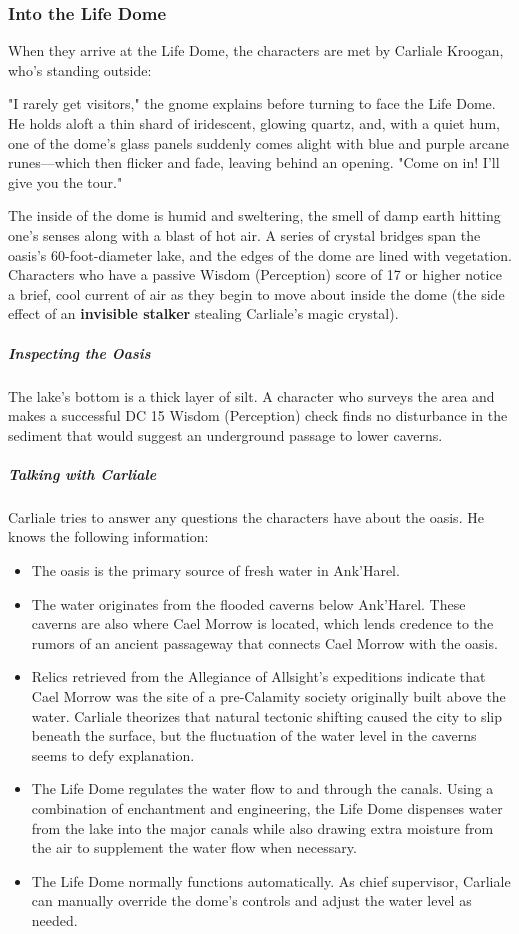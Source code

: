 \documentclass[10pt,a4paper,twoside,fancy,bg=print,twocolumn,openany,nodeprecatedcode]{dndbook}
\begin{document}
\subsubsection{Into the Life Dome}
When they arrive at the Life Dome, the characters are met by Carliale Kroogan, who's standing outside:

\begin{DndReadAloud}{}
"I rarely get visitors," the gnome explains before turning to face the Life Dome. He holds aloft a thin shard of iridescent, glowing quartz, and, with a quiet hum, one of the dome's glass panels suddenly comes alight with blue and purple arcane runes—which then flicker and fade, leaving behind an opening. "Come on in! I'll give you the tour."

\end{DndReadAloud}

The inside of the dome is humid and sweltering, the smell of damp earth hitting one's senses along with a blast of hot air. A series of crystal bridges span the oasis's 60-foot-diameter lake, and the edges of the dome are lined with vegetation. Characters who have a passive Wisdom (Perception) score of 17 or higher notice a brief, cool current of air as they begin to move about inside the dome (the side effect of an \textbf{invisible stalker} stealing Carliale's magic crystal).

\subparagraph{Inspecting the Oasis}
The lake's bottom is a thick layer of silt. A character who surveys the area and makes a successful DC 15 Wisdom (Perception) check finds no disturbance in the sediment that would suggest an underground passage to lower caverns.

\subparagraph{Talking with Carliale}
Carliale tries to answer any questions the characters have about the oasis. He knows the following information:


\begin{itemize}
\item The oasis is the primary source of fresh water in Ank'Harel.
\item The water originates from the flooded caverns below Ank'Harel. These caverns are also where Cael Morrow is located, which lends credence to the rumors of an ancient passageway that connects Cael Morrow with the oasis.
\item Relics retrieved from the Allegiance of Allsight's expeditions indicate that Cael Morrow was the site of a pre-Calamity society originally built above the water. Carliale theorizes that natural tectonic shifting caused the city to slip beneath the surface, but the fluctuation of the water level in the caverns seems to defy explanation.
\item The Life Dome regulates the water flow to and through the canals. Using a combination of enchantment and engineering, the Life Dome dispenses water from the lake into the major canals while also drawing extra moisture from the air to supplement the water flow when necessary.
\item The Life Dome normally functions automatically. As chief supervisor, Carliale can manually override the dome's controls and adjust the water level as needed.
\end{itemize}
\end{document}
